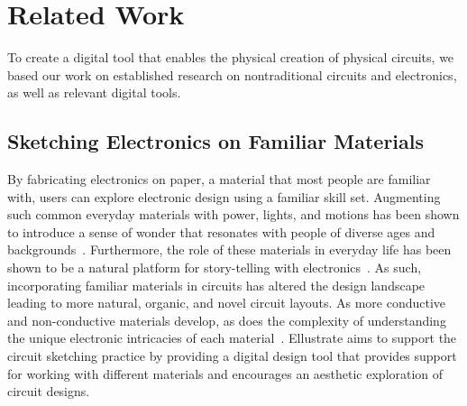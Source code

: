 \documentclass{sigchi}
\begin{document}



\section{Related Work}
To create a digital tool that enables the physical creation of physical circuits, we based our work on established research on nontraditional circuits and electronics, as well as relevant digital tools. 

\subsection{Sketching Electronics on Familiar Materials}
By fabricating electronics on paper, a material that most people are familiar with, users can explore electronic design using a familiar skill set.  Augmenting such common everyday materials with power, lights, and motions has been shown to introduce a sense of wonder that resonates with people of diverse ages and backgrounds~\cite{karagozler_paper_2013,Qi:2010tp,qi_stickers_2015,qi_sketching_2014}. Furthermore, the role of these materials in everyday life has been shown to be a natural platform for story-telling with electronics~\cite{Jacoby:2013cq}. As such, incorporating familiar materials in circuits has altered the design landscape leading to more natural, organic, and novel circuit layouts.
As more conductive and non-conductive materials develop, as does the complexity of understanding the unique electronic intricacies of each material~\cite{Hodges:2014cm}.  Ellustrate aims to support the circuit sketching practice by providing a digital design tool that provides support for working with different materials and encourages an aesthetic exploration of circuit designs.
\end{document}
